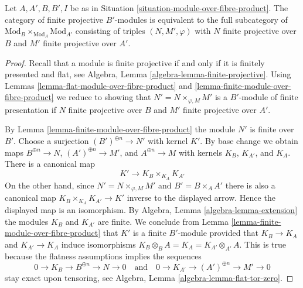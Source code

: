 \begin{lemma}
\label{lemma-finitely-presented-module-over-fibre-product}
Let $A, A', B, B', I$ be as in
Situation \ref{situation-module-over-fibre-product}.
The category of finite projective $B'$-modules
is equivalent to the full subcategory
of $\text{Mod}_B \times_{\text{Mod}_A} \text{Mod}_{A'}$
consisting of triples $(N, M', \varphi)$
with $N$ finite projective over $B$ and $M'$ finite projective over $A'$.
\end{lemma}

\begin{proof}
Recall that a module is finite projective if and only if
it is finitely presented and flat, see
Algebra, Lemma \ref{algebra-lemma-finite-projective}.
Using Lemmas \ref{lemma-flat-module-over-fibre-product} and
\ref{lemma-finite-module-over-fibre-product}
we reduce to showing that $N' = N \times_{\varphi, M} M'$ is
a $B'$-module of finite presentation if
$N$ finite projective over $B$
and $M'$ finite projective over $A'$.

\medskip\noindent
By Lemma \ref{lemma-finite-module-over-fibre-product}
the module $N'$ is finite over $B'$. Choose a surjection
$(B')^{\oplus n} \to N'$ with kernel $K'$. By base change we obtain maps
$B^{\oplus n} \to N$, $(A')^{\oplus n} \to M'$, and $A^{\oplus n} \to M$
with kernels $K_B$, $K_{A'}$, and $K_A$. There is a canonical map
$$
K' \longrightarrow K_B \times_{K_A} K_{A'}
$$
On the other hand, since $N' = N \times_{\varphi, M} M'$ and
$B' = B \times_A A'$ there is also a
canonical map $K_B \times_{K_A} K_{A'} \to K'$ inverse to the displayed
arrow. Hence the displayed map is an isomorphism. By
Algebra, Lemma \ref{algebra-lemma-extension}
the modules $K_B$ and $K_{A'}$ are finite. We conclude from
Lemma \ref{lemma-finite-module-over-fibre-product}
that $K'$ is a finite $B'$-module provided that $K_B \to K_A$ and
$K_{A'} \to K_A$ induce isomorphisms
$K_B \otimes_B A = K_A = K_{A'} \otimes_{A'} A$.
This is true because the flatness assumptions implies the sequences
$$
0 \to K_B \to B^{\oplus n} \to N \to 0
\quad\text{and}\quad
0 \to K_{A'} \to (A')^{\oplus n} \to M' \to 0
$$
stay exact upon tensoring, see
Algebra, Lemma \ref{algebra-lemma-flat-tor-zero}.
\end{proof}

